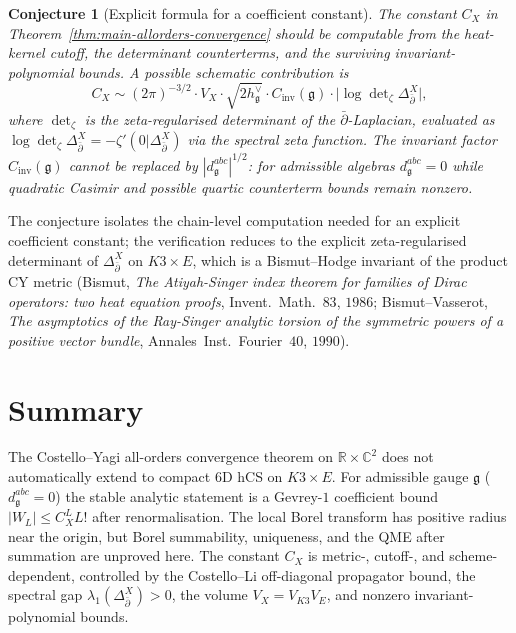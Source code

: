 \documentclass[11pt]{article}
\providecommand{\frakg}{\mathfrak{g}}
\providecommand{\dbar}{\bar{\partial}}
\providecommand{\C}{\mathbb{C}}
\providecommand{\R}{\mathbb{R}}
\newtheorem{conjecture}[theorem]{Conjecture}
\theoremstyle{definition}\newtheorem{definition}[theorem]{Definition}
\theoremstyle{remark}\newtheorem{remark}[theorem]{Remark}\newtheorem{example}[theorem]{Example}
\begin{document}
\begin{conjecture}[Explicit formula for a coefficient constant]
\label{conj:explicit-borel-constant}
The constant $C_X$ in Theorem~\ref{thm:main-allorders-convergence}
should be computable from the heat-kernel cutoff, the determinant
counterterms, and the surviving invariant-polynomial bounds. A possible
schematic contribution is
\begin{equation}
\label{eq:explicit-CX}
C_X \sim (2\pi)^{-3/2}\cdot V_X\cdot\sqrt{2h^\vee_\frakg}\cdot
C_{\mathrm{inv}}(\frakg)\cdot
\bigl|\log\det\nolimits_\zeta\Delta_{\dbar}^X\bigr|,
\end{equation}
where $\det_\zeta$ is the zeta-regularised determinant of the
$\dbar$-Laplacian, evaluated as
$\log\det_\zeta\Delta_{\dbar}^X = -\zeta'(0|\Delta_{\dbar}^X)$ via the
spectral zeta function. The invariant factor
$C_{\mathrm{inv}}(\frakg)$ cannot be replaced by
$|d^{abc}_\frakg|^{1/2}$: for admissible algebras
$d^{abc}_\frakg=0$ while quadratic Casimir and possible quartic
counterterm bounds remain nonzero.
\end{conjecture}

The conjecture isolates the chain-level computation needed for an
explicit coefficient constant; the verification reduces to the explicit
zeta-regularised determinant of $\Delta_{\dbar}^X$ on $K3\times E$,
which is a Bismut--Hodge invariant of the product CY metric (Bismut,
\emph{The Atiyah-Singer index theorem for families of Dirac operators:
two heat equation proofs}, Invent.~Math.~$83$, $1986$;
Bismut--Vasserot, \emph{The asymptotics of the Ray-Singer analytic
torsion of the symmetric powers of a positive vector bundle},
Annales~Inst.~Fourier~$40$, $1990$).

\section{Summary}

The Costello--Yagi all-orders convergence theorem on $\R\times\C^2$
does not automatically extend to compact $6$D hCS on $K3\times E$.
For admissible gauge $\frakg$ \textup{(}$d^{abc}_\frakg = 0$\textup{)}
the stable analytic statement is a Gevrey-$1$ coefficient bound
$|W_L|\leq C_X^L L!$ after renormalisation. The local Borel transform
has positive radius near the origin, but Borel summability, uniqueness,
and the QME after summation are unproved here. The constant $C_X$ is
metric-, cutoff-, and scheme-dependent, controlled by the Costello--Li
off-diagonal propagator bound, the spectral gap
$\lambda_1(\Delta_{\dbar}^X) > 0$, the volume $V_X = V_{K3}V_E$, and
nonzero invariant-polynomial bounds.
\end{document}
